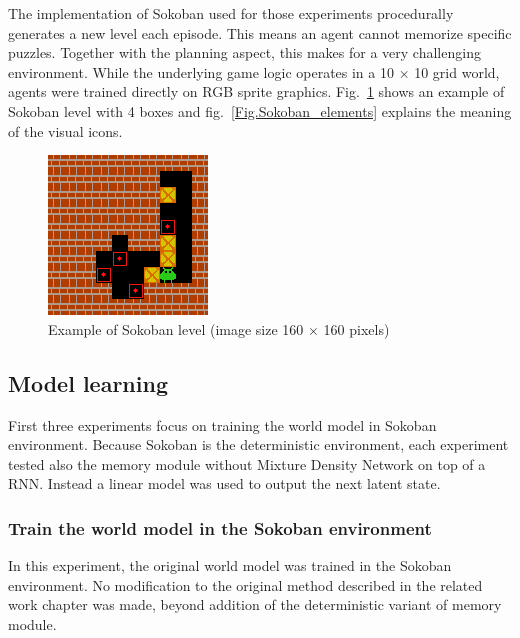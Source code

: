 The implementation of Sokoban\cite{Code.Sokoban} used for those experiments procedurally generates a new level each episode. This means an agent cannot memorize specific puzzles. Together with the planning aspect, this makes for a very challenging environment. While the underlying game logic operates in a 10 × 10 grid world, agents were trained directly on RGB sprite graphics. Fig.~\ref{Fig.Sokoban} shows an example of Sokoban level with 4 boxes and fig.~\ref{Fig.Sokoban_elements} explains the meaning of the visual icons.


\begin{figure}[H]
\includegraphics[]{figures/Sokoban.png}
\caption[Sokoban]{Example of Sokoban level (image size 160 × 160 pixels)}
\label{Fig.Sokoban}
\end{figure}

\subsection{Model learning}

First three experiments focus on training the world model in Sokoban environment. Because Sokoban is the deterministic environment, each experiment tested also the memory module without Mixture Density Network on top of a RNN. Instead a linear model was used to output the next latent state. 

\subsubsection{Train the world model in the Sokoban environment}

In this experiment, the original world model was trained in the Sokoban environment. No modification to the original method described in the related work chapter was made, beyond addition of the deterministic variant of memory module.

